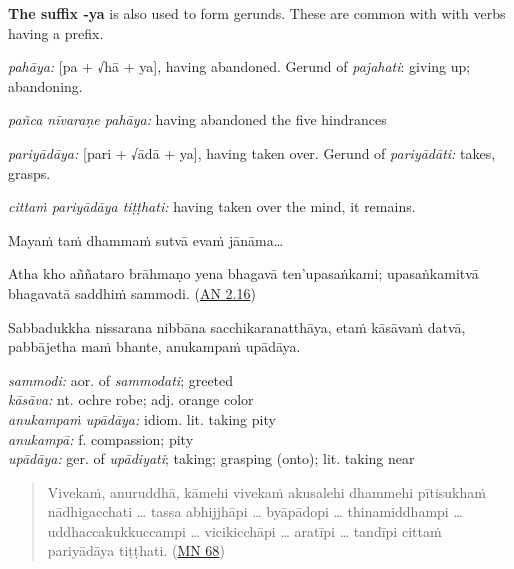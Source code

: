 \documentclass[11pt,oneside]{memoir}
\begin{document}
\normalArrayStrech

\textbf{The suffix -ya} is also used to form gerunds. These are common with with verbs having a prefix.

\emph{pahāya:} [pa + √hā + ya], having abandoned. Gerund of \emph{pajahati}: giving up; abandoning.

\emph{pañca nīvaraṇe pahāya:} having abandoned the five hindrances

\emph{pariyādāya:} [pari + √ādā + ya], having taken over. Gerund of \emph{pariyādāti:} takes, grasps.

\emph{cittaṁ pariyādāya tiṭṭhati:} having taken over the mind, it remains.

\bigskip

\begin{widecols}
Mayaṁ taṁ dhammaṁ sutvā evaṁ jānāma\ldots{}

Atha kho aññataro brāhmaṇo yena bhagavā ten'upasaṅkami; upasaṅkamitvā bhagavatā saddhiṁ sammodi. (\href{https://suttacentral.net/an2.11-20/pli/ms}{AN 2.16})

Sabbadukkha nissarana nibbāna sacchikaranatthāya, etaṁ kāsāvaṁ datvā, pabbājetha maṁ bhante, anukampaṁ upādāya.

\columnbreak

\emph{sammodi:} aor. of \emph{sammodati}; greeted \\[0pt]
\emph{kāsāva:} nt. ochre robe; adj. orange color \\[0pt]
\emph{anukampaṁ upādāya:} idiom. lit. taking pity \\[0pt]
\emph{anukampā:} f. compassion; pity \\[0pt]
\emph{upādāya:} ger. of \emph{upādiyati}; taking; grasping (onto); lit. taking near
\end{widecols}

\clearpage

\begin{quote}
Vivekaṁ, anuruddhā, kāmehi vivekaṁ akusalehi dhammehi pītisukhaṁ nādhigacchati \ldots{} tassa abhijjhāpi
\ldots{} byāpādopi \ldots{} thinamiddhampi \ldots{} uddhaccakukkuccampi \ldots{} vicikicchāpi \ldots{}
aratīpi \ldots{} tandīpi cittaṁ pariyādāya tiṭṭhati. (\href{https://suttacentral.net/mn68/pli/ms}{MN 68})
\end{quote}
\end{document}
